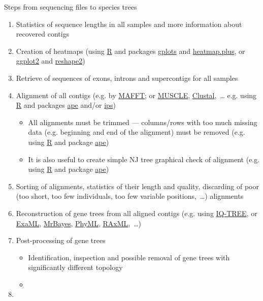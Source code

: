 \documentclass[compress, ucs, xelatex, 11pt, xcolor=x11names, aspectratio=1609,
	hyperref={
		bookmarks=true,
		unicode=true,
		colorlinks=true,
		pdftitle={HybSeq course},
		plainpages=false,
		pdfauthor={Vojtech Zeisek},
		pdfsubject={Practical processing of HybSeq target enrichment sequencing data on computing grids like MetaCentrum},
		pdfcreator={XeLaTeX},
		pdfkeywords={BASH, command line, GNU, HybSeq, Linux, MetaCentrum, sequencing shell, target enrichment},
		linkcolor=Cyan2, %
		anchorcolor=Firebrick2, %
		citecolor=Firebrick2, %
		filecolor=Firebrick2, %
		menucolor=Firebrick2, %
		urlcolor=Chartreuse2, %
		pdftex},
	url={hyphens, lowtilde} %
	]{beamer}
\begin{document}
\begin{frame}[allowframebreaks]{Steps from sequencing files to species trees}
\begin{enumerate}
\begin{enumerate}
			\item Recovering of the individual sequences
			\item Statistics of the recovery
			\item Cleanup of temporal files (especially SPAdes produces huge amount of data unneeded for further processing)
		\end{enumerate}
		\item Statistics of sequence lengths in all samples and more information about recovered contigs
		\item Creation of heatmaps (using \href{https://www.r-project.org/}{R} and packages \href{https://cran.r-project.org/package=gplots}{gplots} and \href{https://cran.r-project.org/package=heatmap.plus}{heatmap.plus}, or \href{https://cran.r-project.org/package=ggplot2}{ggplot2} and \href{https://cran.r-project.org/package=reshape2}{reshape2})
		\item Retrieve of sequences of exons, introns and supercontigs for all samples
		\item Alignment of all contigs (e.g. by \href{https://mafft.cbrc.jp/alignment/software/}{MAFFT}; or \href{https://www.drive5.com/muscle/}{MUSCLE}, \href{http://www.clustal.org/}{Clustal},~\ldots{ }e.g. using \href{https://www.r-project.org/}{R} and packages \href{https://cran.r-project.org/package=ape}{ape} and/or \href{https://cran.r-project.org/package=ips}{ips})
		\begin{itemize}
			\item All alignments must be trimmed --- columns/rows with too much missing data (e.g. beginning and end of the alignment) must be removed (e.g. using \href{https://www.r-project.org/}{R} and package \href{https://cran.r-project.org/package=ape}{ape})
			\item It is also useful to create simple NJ tree graphical check of alignment (e.g. using \href{https://www.r-project.org/}{R} and package \href{https://cran.r-project.org/package=ape}{ape})
		\end{itemize}
		\item Sorting of alignments, statistics of their length and quality, discarding of poor (too short, too few individuals, too few variable positions,~\ldots) alignments
		\item Reconstruction of gene trees from all aligned contigs (e.g. using \href{http://www.iqtree.org/}{IQ-TREE}, or \href{https://github.com/stamatak/ExaML}{ExaML}, \href{https://nbisweden.github.io/MrBayes/}{MrBayes}, \href{http://www.atgc-montpellier.fr/phyml/}{PhyML}, \href{https://github.com/stamatak/standard-RAxML}{RAxML},~\ldots)
		\item Post-processing of gene trees
		\begin{itemize}
			\item Identification, inspection and possible removal of gene trees with significantly different topology
			\item 
		\end{itemize}
		\item 
	\end{enumerate}
\end{frame}
\end{document}
